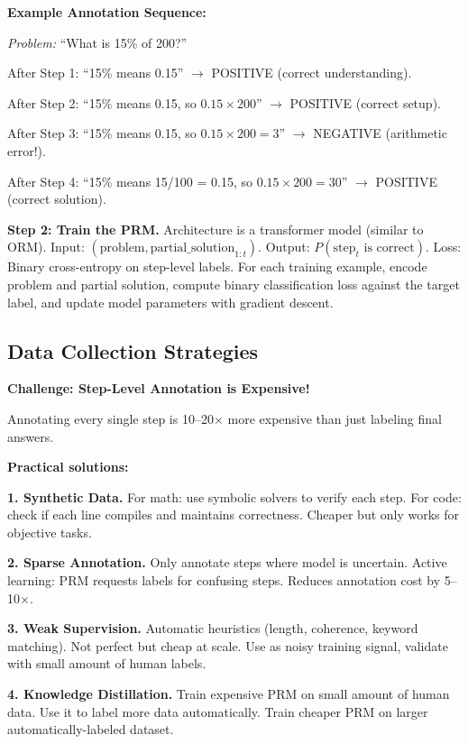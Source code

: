 \begin{chapterenv}
\begin{infobox}
\textbf{Example Annotation Sequence:}

\textit{Problem:} ``What is 15\% of 200?''

After Step 1: ``15\% means 0.15'' $\to$ POSITIVE (correct understanding).

After Step 2: ``15\% means 0.15, so $0.15 \times 200$'' $\to$ POSITIVE (correct setup).

After Step 3: ``15\% means 0.15, so $0.15 \times 200 = 3$'' $\to$ NEGATIVE (arithmetic error!).

After Step 4: ``15\% means 15/100 = 0.15, so $0.15 \times 200 = 30$'' $\to$ POSITIVE (correct solution).

\textbf{Step 2: Train the PRM.} Architecture is a transformer model (similar to ORM). Input: $(\text{problem}, \text{partial\_solution}_{1:t})$. Output: $P(\text{step}_t \text{ is correct})$. Loss: Binary cross-entropy on step-level labels. For each training example, encode problem and partial solution, compute binary classification loss against the target label, and update model parameters with gradient descent.
\end{infobox}

\subsection{Data Collection Strategies}

\begin{infobox}
\textbf{Challenge: Step-Level Annotation is Expensive!}

Annotating every single step is 10--20$\times$ more expensive than just labeling final answers.

\textbf{Practical solutions:}

\textbf{1. Synthetic Data.} For math: use symbolic solvers to verify each step. For code: check if each line compiles and maintains correctness. Cheaper but only works for objective tasks.

\textbf{2. Sparse Annotation.} Only annotate steps where model is uncertain. Active learning: PRM requests labels for confusing steps. Reduces annotation cost by 5--10$\times$.

\textbf{3. Weak Supervision.} Automatic heuristics (length, coherence, keyword matching). Not perfect but cheap at scale. Use as noisy training signal, validate with small amount of human labels.

\textbf{4. Knowledge Distillation.} Train expensive PRM on small amount of human data. Use it to label more data automatically. Train cheaper PRM on larger automatically-labeled dataset.
\end{infobox}


\end{chapterenv}
